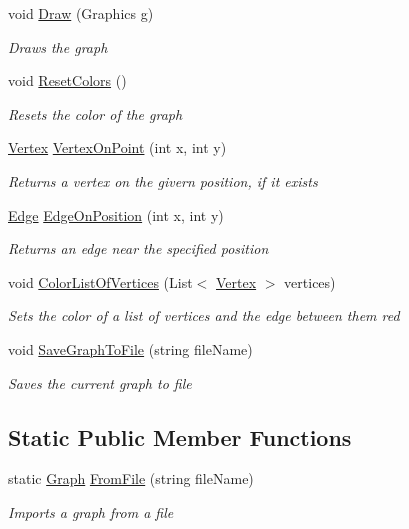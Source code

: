 \begin{DoxyCompactItemize}
void \hyperlink{class_graph_1_1_graph_a04383a2aa3ff3f112d7b87408d7d573e}{Draw} (Graphics g)
\begin{DoxyCompactList}\small\item\em Draws the graph \end{DoxyCompactList}\item 
void \hyperlink{class_graph_1_1_graph_a74876b10cb94ff9f17ef17c674cc14d2}{Reset\+Colors} ()
\begin{DoxyCompactList}\small\item\em Resets the color of the graph \end{DoxyCompactList}\item 
\hyperlink{class_graph_1_1_vertex}{Vertex} \hyperlink{class_graph_1_1_graph_a3916416db4cf90b2afee5e7162c29875}{Vertex\+On\+Point} (int x, int y)
\begin{DoxyCompactList}\small\item\em Returns a vertex on the givern position, if it exists \end{DoxyCompactList}\item 
\hyperlink{class_graph_1_1_edge}{Edge} \hyperlink{class_graph_1_1_graph_ade3b10eb74bb3a2c8b1cbbe0069adfca}{Edge\+On\+Position} (int x, int y)
\begin{DoxyCompactList}\small\item\em Returns an edge near the specified position \end{DoxyCompactList}\item 
void \hyperlink{class_graph_1_1_graph_af328fc96d21cc0b8edba5ae71317b7e9}{Color\+List\+Of\+Vertices} (List$<$ \hyperlink{class_graph_1_1_vertex}{Vertex} $>$ vertices)
\begin{DoxyCompactList}\small\item\em Sets the color of a list of vertices and the edge between them red \end{DoxyCompactList}\item 
void \hyperlink{class_graph_1_1_graph_a7046489eb0f0149305bd361dd84c34a1}{Save\+Graph\+To\+File} (string file\+Name)
\begin{DoxyCompactList}\small\item\em Saves the current graph to file \end{DoxyCompactList}\end{DoxyCompactItemize}
\subsection*{Static Public Member Functions}
\begin{DoxyCompactItemize}
\item 
static \hyperlink{class_graph_1_1_graph}{Graph} \hyperlink{class_graph_1_1_graph_a7454bf91b0c01f5702082d5aa511c539}{From\+File} (string file\+Name)
\begin{DoxyCompactList}\small\item\em Imports a graph from a file \end{DoxyCompactList}\end{DoxyCompactItemize}
